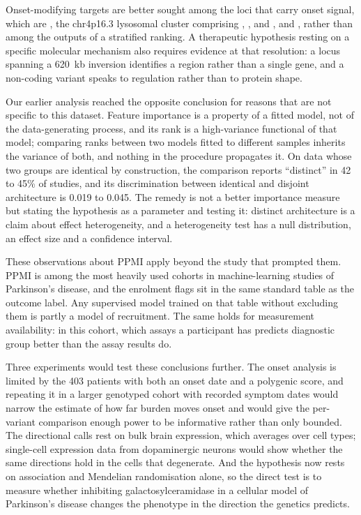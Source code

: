 \documentclass[10pt]{article}
\begin{document}
Onset-modifying targets are better sought among the loci that carry onset signal, which are , the chr4p16.3 lysosomal cluster comprising , ,
 and , and , rather than among the outputs of a stratified
ranking. A therapeutic hypothesis resting on a specific molecular mechanism also requires evidence
at that resolution: a locus spanning a 620~kb inversion identifies a region rather than a single gene, and a non-coding variant speaks to regulation rather than to protein shape.

Our earlier analysis reached the opposite conclusion for reasons that are not specific to this dataset. Feature importance is a property of a fitted model, not of the data-generating process, and its
rank is a high-variance functional of that model; comparing ranks between two models fitted to
different samples inherits the variance of both, and nothing in the procedure propagates it. On
data whose two groups are identical by construction, the comparison reports ``distinct'' in 42 to
45\% of studies, and its discrimination between identical and disjoint architecture is 0.019 to
0.045. The remedy is not a better importance measure but stating the hypothesis as a parameter and
testing it: distinct architecture is a claim about effect heterogeneity, and a heterogeneity test
has a null distribution, an effect size and a confidence interval.

These observations about PPMI apply beyond the study that prompted them. PPMI is among the most heavily used cohorts in machine-learning studies of Parkinson's disease, and the enrolment flags
sit in the same standard table as the outcome label. Any supervised model trained on that table
without excluding them is partly a model of recruitment. The same holds for measurement
availability: in this cohort, which assays a participant has predicts diagnostic group better than
the assay results do.

Three experiments would test these conclusions further. The onset analysis is
limited by the 403 patients with both an onset date and a polygenic score, and
repeating it in a larger genotyped cohort with recorded symptom dates would
narrow the estimate of how far burden moves onset and would give the per-variant
comparison enough power to be informative rather than only bounded. The
directional calls rest on bulk brain expression, which averages over cell types;
single-cell expression data from dopaminergic neurons would show whether the
same directions hold in the cells that degenerate. And the 
hypothesis now rests on association and Mendelian randomisation alone, so the
direct test is to measure whether inhibiting galactosylceramidase in a cellular
model of Parkinson's disease changes the phenotype in the direction the genetics
predicts.
\end{document}
